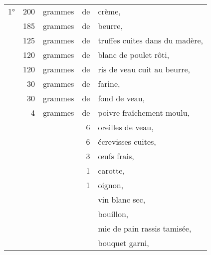 \footnotesize
\begin{tabular}{@{}lrrrp{18em}}
\normalsize1°\footnotesize & 200 & grammes & de & crème,                                                  \\
  & 185 & grammes & de & beurre,                                                                          \\
  & 125 & grammes & de & truffes cuites dans du madère,                                                   \\
  & 120 & grammes & de & blanc de poulet rôti,                                                            \\
  & 120 & grammes & de & ris de veau cuit au beurre,                                                      \\
  &  30 & grammes & de & farine,                                                                          \\
  &  30 & grammes & de & fond de veau,                                                                    \\
  &   4 & grammes & de & poivre fraîchement moulu,                                                        \\
  &     &         &  6 & oreilles de veau,                                                                \\
  &     &         &  6 & écrevisses cuites,                                                               \\
  &     &         &  3 & œufs frais,                                                                      \\
  &     &         &  1 & carotte,                                                                         \\
  &     &         &  1 & oignon,                                                                          \\
  &     &         &    & vin blanc sec,                                                                   \\
  &     &         &    & bouillon,                                                                        \\
  &     &         &    & mie de pain rassis tamisée,                                                      \\
  &     &         &    & bouquet garni,                                                                   \\

\end{tabular}
